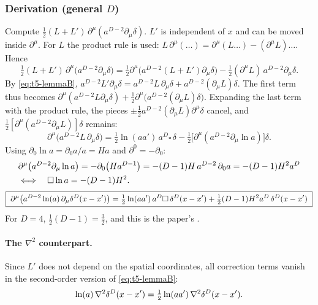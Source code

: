 \subsubsection{Derivation (general \texorpdfstring{$D$}{D})}
Compute \(\tfrac12(L+L')\,\partial^\mu(a^{D-2}\partial_\mu\delta)\). \(L'\) is independent of \(x\) and
can be moved inside \(\partial^\mu\). For \(L\) the product rule is used:
\(L\,\partial^\mu(\ldots)=\partial^\mu(L\ldots)-(\partial^\mu L)\ldots\). Hence
\begin{equation*}
\tfrac12(L+L')\,\partial^\mu\bigl(a^{D-2}\partial_\mu\delta\bigr)=\tfrac12\partial^\mu\bigl(a^{D-2}(L+L')\partial_\mu\delta\bigr)-\tfrac12(\partial^\mu L)\,a^{D-2}\partial_\mu\delta .
\end{equation*}
By \eqref{eq:t5-lemmaB}, \(a^{D-2}L'\partial_\mu\delta=a^{D-2}L\,\partial_\mu\delta+a^{D-2}(\partial_\mu L)\delta\). The
first term thus becomes \(\partial^\mu(a^{D-2}L\partial_\mu\delta)+\tfrac12\partial^\mu\bigl(a^{D-2}(\partial_\mu L)\delta\bigr)\).
Expanding the last term with the product rule, the pieces \(\pm\tfrac12a^{D-2}(\partial_\mu L)\partial^\mu\delta\)
cancel, and \(\tfrac12[\partial^\mu(a^{D-2}\partial_\mu L)]\delta\) remains:
\begin{equation}\label{eq:t5-43step}
\partial^\mu\bigl(a^{D-2}L\,\partial_\mu\delta\bigr)=\tfrac12\ln(aa')\,a^D\square\,\delta-\tfrac12\bigl[\partial^\mu(a^{D-2}\partial_\mu\ln a)\bigr]\delta .
\end{equation}
Using \(\partial_0\ln a=\partial_0a/a=Ha\) and \(\partial^0=-\partial_0\):
\begin{equation}\label{eq:t5-boxlna}
\begin{aligned}\relax&\partial^\mu\bigl(a^{D-2}\partial_\mu\ln a\bigr)=-\partial_0\bigl(Ha^{D-1}\bigr)=-(D-1)H\,a^{D-2}\,\partial_0a=-(D-1)H^2a^D\\
&\Longleftrightarrow\quad \square\ln a=-(D-1)H^2 .\end{aligned}
\end{equation}
\begin{equation}\label{eq:t5-I43D}
\boxed{\;\partial^\mu\bigl(a^{D-2}\ln(a)\,\partial_\mu\delta^D(x-x')\bigr)=\tfrac12\ln(aa')\,a^D\square\,\delta^D(x-x')+\tfrac12(D-1)H^2a^D\,\delta^D(x-x')\;}
\end{equation}
For \(D=4\), \(\tfrac12(D-1)=\tfrac32\), and this is the paper's  \chIIok.

\paragraph{The \(\nabla^2\) counterpart.} Since \(L'\) does not depend on the spatial coordinates, all
correction terms vanish in the second-order version of \eqref{eq:t5-lemmaB}:
\begin{equation}\label{eq:t5-lap}
\ln(a)\,\nabla^2\delta^D(x-x')=\tfrac12\ln(aa')\,\nabla^2\delta^D(x-x') .
\end{equation}

